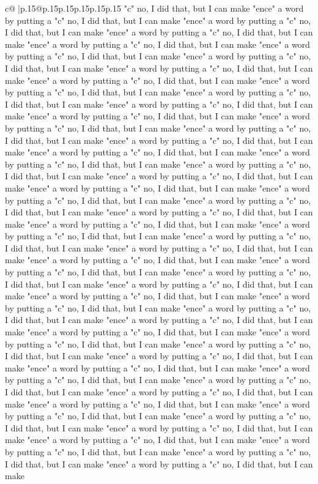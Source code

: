 \documentclass{article}
\begin{document}
{\begin{supertabular}{c@{$\;$}|p{.15\linewidth}@{}p{.15\linewidth}p{.15\linewidth}p{.15\linewidth}p{.15\linewidth}p{.15\linewidth}}
{{{"c" no, I did that, but I can make "ence" a word by putting a "c" no, I did that, but I can make "ence" a word by putting a "c" no, I did that, but I can make "ence" a word by putting a "c" no, I did that, but I can make "ence" a word by putting a "c" no, I did that, but I can make "ence" a word by putting a "c" no, I did that, but I can make "ence" a word by putting a "c" no, I did that, but I can make "ence" a word by putting a "c" no, I did that, but I can make "ence" a word by putting a "c" no, I did that, but I can make "ence" a word by putting a "c" no, I did that, but I can make "ence" a word by putting a "c" no, I did that, but I can make "ence" a word by putting a "c" no, I did that, but I can make "ence" a word by putting a "c" no, I did that, but I can make "ence" a word by putting a "c" no, I did that, but I can make "ence" a word by putting a "c" no, I did that, but I can make "ence" a word by putting a "c" no, I did that, but I can make "ence" a word by putting a "c" no, I did that, but I can make "ence" a word by putting a "c" no, I did that, but I can make "ence" a word by putting a "c" no, I did that, but I can make "ence" a word by putting a "c" no, I did that, but I can make "ence" a word by putting a "c" no, I did that, but I can make "ence" a word by putting a "c" no, I did that, but I can make "ence" a word by putting a "c" no, I did that, but I can make "ence" a word by putting a "c" no, I did that, but I can make "ence" a word by putting a "c" no, I did that, but I can make "ence" a word by putting a "c" no, I did that, but I can make "ence" a word by putting a "c" no, I did that, but I can make "ence" a word by putting a "c" no, I did that, but I can make "ence" a word by putting a "c" no, I did that, but I can make "ence" a word by putting a "c" no, I did that, but I can make "ence" a word by putting a "c" no, I did that, but I can make "ence" a word by putting a "c" no, I did that, but I can make "ence" a word by putting a "c" no, I did that, but I can make "ence" a word by putting a "c" no, I did that, but I can make "ence" a word by putting a "c" no, I did that, but I can make "ence" a word by putting a "c" no, I did that, but I can make "ence" a word by putting a "c" no, I did that, but I can make "ence" a word by putting a "c" no, I did that, but I can make "ence" a word by putting a "c" no, I did that, but I can make "ence" a word by putting a "c" no, I did that, but I can make "ence" a word by putting a "c" no, I did that, but I can make "ence" a word by putting a "c" no, I did that, but I can make "ence" a word by putting a "c" no, I did that, but I can make "ence" a word by putting a "c" no, I did that, but I can make "ence" a word by putting a "c" no, I did that, but I can make "ence" a word by putting a "c" no, I did that, but I can make "ence" a word by putting a "c" no, I did that, but I can make "ence" a word by putting a "c" no, I did that, but I can make "ence" a word by putting a "c" no, I did that, but I can make "ence" a word by putting a "c" no, I did that, but I can make "ence" a word by putting a "c" no, I did that, but I can make "ence" a word by putting a "c" no, I did that, but I can make }}}
\end{supertabular}}
\end{document}
